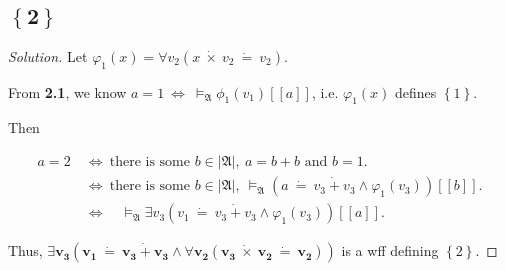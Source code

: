 \documentclass{article}
\newcommand{\set}[1]{\left\{#1\right\}}
\newenvironment{solution}{\begin{proof}[\noindent\it Solution]}{\end{proof}}
\begin{document}
\vspace{1em}
\subsection{$\boldsymbol{\set{2}}$}
\vspace{.5em}
\begin{solution}
    Let $\varphi_{1}(x)=\forall v_2 \left(x\ \dot{\times}\ v_2\ \dot{=}\ v_2\right)$.
    
    \hspace{2.6em}
    From \textbf{2.1}, we know 
    $a=1\ \Longleftrightarrow\ \vDash_{\mathfrak{A}}\phi_1(v_1)[\![a]\!]$, i.e. $\varphi_1(x)$ defines $\set{1}$.

    \vspace{0.15em} \hspace{2.6em}
    Then

    \vspace{-5.1em}
    \begin{align*}
        a=2\ &\Longleftrightarrow\ \text{there is some }b\in|\mathfrak{A}|,\ a = b + b \text{ and }b = 1. \\
        & \Longleftrightarrow\ \text{there is some }b\in|\mathfrak{A}|,\ \vDash_\mathfrak{A} \left(a\ \dot{=}\ v_3\ \dot{+}\ v_3\land \varphi_1(v_3)\right)[\![b]\!]. \\
        & \Longleftrightarrow \quad \vDash_\mathfrak{A} \exists v_3 \left(v_1\ \dot{=}\ v_3\ \dot{+}\ v_3\land \varphi_1(v_3)\right)[\![a]\!].
    \end{align*}

    \vspace{-0.8em} \hspace{2.6em}
    Thus, $\boldsymbol{\exists v_3 \left(v_1\ \dot{=}\ v_3\ \dot{+}\ v_3\land \forall v_2 \left(v_3\ \dot{\times}\ v_2\ \dot{=}\ v_2\right)\right)}$ is a wff defining $\set{2}$.
\end{solution}

\vspace{1em}
\end{document}
